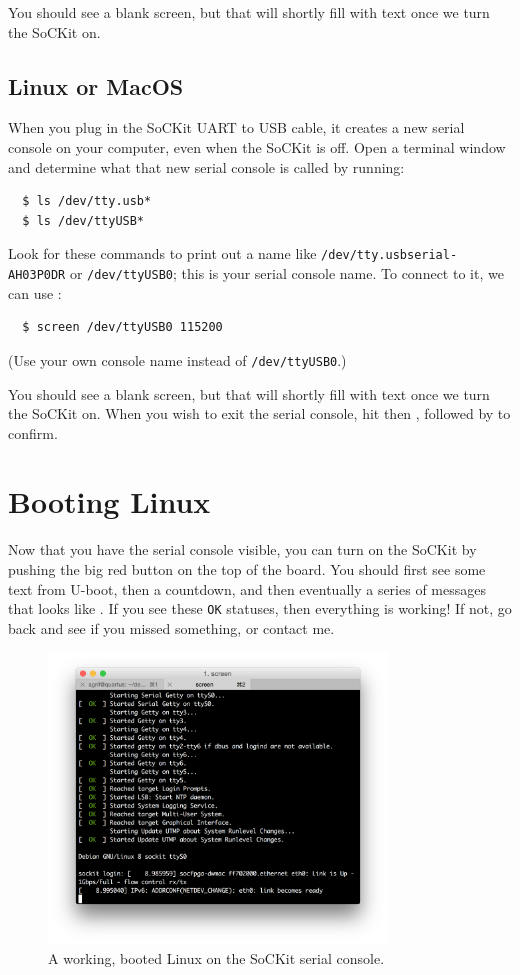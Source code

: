 \documentclass{sockitguide}
\begin{document}
You should see a blank screen, but that will shortly fill with text
once we turn the SoCKit on.

\subsection{Linux or MacOS}

When you plug in the SoCKit UART to USB cable, it creates a new serial
console on your computer, even when the SoCKit is off. Open a terminal
window and determine what that new serial console is called by
running:
\begin{verbatim}
  $ ls /dev/tty.usb*
  $ ls /dev/ttyUSB*
\end{verbatim}

Look for these commands to print out a name like
\texttt{/dev/tty.usbserial-AH03P0DR} or \texttt{/dev/ttyUSB0}; this is
your serial console name. To connect to it, we can use :
\begin{verbatim}
  $ screen /dev/ttyUSB0 115200
\end{verbatim}
(Use your own console name instead of \texttt{/dev/ttyUSB0}.)

You should see a blank screen, but that will shortly fill with text
once we turn the SoCKit on. When you wish to exit the serial console,
hit  then , followed by  to confirm.

\section{Booting Linux}

Now that you have the serial console visible, you can turn on the
SoCKit by pushing the big red button on the top of the board. You
should first see some text from U-boot, then a countdown, and then
eventually a series of messages that looks like . If
you see these \texttt{OK} statuses, then everything is working! If
not, go back and see if you missed something, or contact me.

\begin{figure}
  \includegraphics[width=9cm]{figures/boot.png}
  \caption{A working, booted Linux on the SoCKit serial console.}
  \label{fig:boot}
\end{figure}
\end{document}
